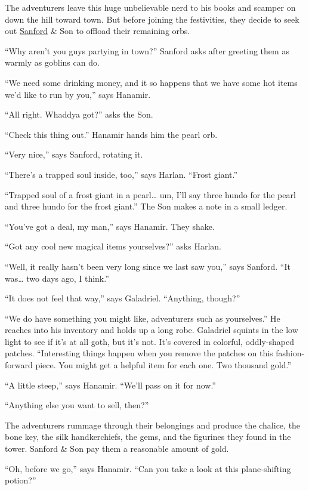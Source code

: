 \documentclass[smalldemyvopaper,11pt,twoside,onecolumn,openright,extrafontsizes]{memoir}
\begin{document}
The adventurers leave this huge unbelievable nerd to his books and
scamper on down the hill toward town. But before joining the
festivities, they decide to seek out
\href{/characters/sanford/}{Sanford} \& Son to offload their remaining
orbs.

``Why aren't you guys partying in town?'' Sanford asks after greeting
them as warmly as goblins can do.

``We need some drinking money, and it so happens that we have some hot
items we'd like to run by you,'' says Hanamir.

``All right. Whaddya got?'' asks the Son.

``Check this thing out.'' Hanamir hands him the pearl orb.

``Very nice,'' says Sanford, rotating it.

``There's a trapped soul inside, too,'' says Harlan. ``Frost giant.''

``Trapped soul of a frost giant in a pearl\ldots{} um, I'll say three
hundo for the pearl and three hundo for the frost giant.'' The Son makes
a note in a small ledger.

``You've got a deal, my man,'' says Hanamir. They shake.

``Got any cool new magical items yourselves?'' asks Harlan.

``Well, it really hasn't been very long since we last saw you,'' says
Sanford. ``It was\ldots{} two days ago, I think.''

``It does not feel that way,'' says Galadriel. ``Anything, though?''

``We do have something you might like, adventurers such as yourselves.''
He reaches into his inventory and holds up a long robe. Galadriel
squints in the low light to see if it's at all goth, but it's not. It's
covered in colorful, oddly-shaped patches. ``Interesting things happen
when you remove the patches on this fashion-forward piece. You might get
a helpful item for each one. Two thousand gold.''

``A little steep,'' says Hanamir. ``We'll pass on it for now.''

``Anything else you want to sell, then?''

The adventurers rummage through their belongings and produce the
chalice, the bone key, the silk handkerchiefs, the gems, and the
figurines they found in the tower. Sanford \& Son pay them a reasonable
amount of gold.

``Oh, before we go,'' says Hanamir. ``Can you take a look at this
plane-shifting potion?''
\end{document}
